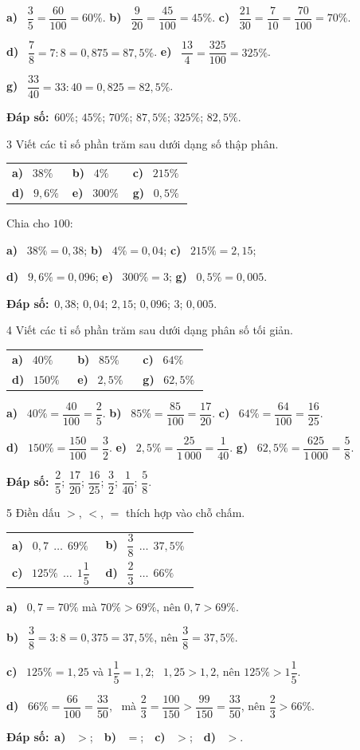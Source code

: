 \documentclass[11pt]{article}
\makeatletter
\newif\ifsol \solfalse
\renewcommand{\arraystretch}{1.35}
\providecommand{\AnsWord}{Đáp số}
\newcommand{\dapso}[1]{\par\textbf{\AnsWord:}\ #1}
\newcommand{\probsol}[1]{%
  \begin{lrbox}{\solmeasure}\begin{minipage}{\dimexpr\linewidth-24pt\relax}#1\end{minipage}\end{lrbox}%
  \ifsol
    \begin{solbox}#1\end{solbox}%
  \else
    \setlength{\solht}{\dimexpr\ht\solmeasure+\dp\solmeasure+0.85cm\relax}%
    \ifdim\solht<1.35cm\setlength{\solht}{1.35cm}\fi
    \begin{tcolorbox}[colback=white,colframe=Line,boxrule=0.8pt,arc=5pt,
      left=8pt,right=8pt,top=4pt,bottom=4pt,height=\solht]{\footnotesize\color{Slate}\itshape\WorkWord}\end{tcolorbox}%
  \fi}
\newcommand{\pa}[1]{\textbf{#1)}\ }
\newenvironment{cols2}{\par\vspace{3pt}\noindent\setlength{\tabcolsep}{0pt}\renewcommand{\arraystretch}{1.3}%
  \begin{tabular}{@{}>{\raggedright\arraybackslash\rule{0pt}{4.4ex}}p{0.48\linewidth}<{\rule[-2.3ex]{0pt}{0pt}}@{\hspace{0.03\linewidth}}>{\raggedright\arraybackslash\rule{0pt}{4.4ex}}p{0.48\linewidth}<{\rule[-2.3ex]{0pt}{0pt}}@{}}}%
  {\end{tabular}\par}
\newenvironment{cols3}{\par\vspace{3pt}\noindent\setlength{\tabcolsep}{0pt}\renewcommand{\arraystretch}{1.3}%
  \begin{tabular}{@{}>{\raggedright\arraybackslash\rule{0pt}{4.4ex}}p{0.32\linewidth}<{\rule[-2.3ex]{0pt}{0pt}}@{\hspace{0.015\linewidth}}>{\raggedright\arraybackslash\rule{0pt}{4.4ex}}p{0.32\linewidth}<{\rule[-2.3ex]{0pt}{0pt}}@{\hspace{0.015\linewidth}}>{\raggedright\arraybackslash\rule{0pt}{4.4ex}}p{0.32\linewidth}<{\rule[-2.3ex]{0pt}{0pt}}@{}}}%
  {\end{tabular}\par}
\newcommand{\gap}{\vspace{0.3cm}}
\def\WorkWord{Bài làm:}
\def\AnsWord{Đáp số}
\makeatother
\begin{document}
\probsol{
\pa{a} $\dfrac35=\dfrac{60}{100}=60\%$. \quad \pa{b} $\dfrac9{20}=\dfrac{45}{100}=45\%$. \quad \pa{c} $\dfrac{21}{30}=\dfrac7{10}=\dfrac{70}{100}=70\%$.\par
\pa{d} $\dfrac78=7:8=0{,}875=87{,}5\%$. \quad \pa{e} $\dfrac{13}4=\dfrac{325}{100}=325\%$.\par
\pa{g} $\dfrac{33}{40}=33:40=0{,}825=82{,}5\%$.
\dapso{$60\%$; $45\%$; $70\%$; $87{,}5\%$; $325\%$; $82{,}5\%$.}}
\gap
\begin{probbox}{3}{\relax}
Viết các tỉ số phần trăm sau dưới dạng số thập phân.
\begin{cols3}
\pa{a} $38\%$ & \pa{b} $4\%$ & \pa{c} $215\%$\\
\pa{d} $9{,}6\%$ & \pa{e} $300\%$ & \pa{g} $0{,}5\%$
\end{cols3}
\end{probbox}
\probsol{
Chia cho $100$:\par
\pa{a} $38\%=0{,}38$; \quad \pa{b} $4\%=0{,}04$; \quad \pa{c} $215\%=2{,}15$;\par
\pa{d} $9{,}6\%=0{,}096$; \quad \pa{e} $300\%=3$; \quad \pa{g} $0{,}5\%=0{,}005$.
\dapso{$0{,}38$; $0{,}04$; $2{,}15$; $0{,}096$; $3$; $0{,}005$.}}
\gap
\begin{probbox}{4}{\relax}
Viết các tỉ số phần trăm sau dưới dạng phân số tối giản.
\begin{cols3}
\pa{a} $40\%$ & \pa{b} $85\%$ & \pa{c} $64\%$\\
\pa{d} $150\%$ & \pa{e} $2{,}5\%$ & \pa{g} $62{,}5\%$
\end{cols3}
\end{probbox}
\probsol{
\pa{a} $40\%=\dfrac{40}{100}=\dfrac25$. \quad \pa{b} $85\%=\dfrac{85}{100}=\dfrac{17}{20}$. \quad \pa{c} $64\%=\dfrac{64}{100}=\dfrac{16}{25}$.\par
\pa{d} $150\%=\dfrac{150}{100}=\dfrac32$. \quad \pa{e} $2{,}5\%=\dfrac{25}{1\,000}=\dfrac1{40}$. \quad \pa{g} $62{,}5\%=\dfrac{625}{1\,000}=\dfrac58$.
\dapso{$\dfrac25$; $\dfrac{17}{20}$; $\dfrac{16}{25}$; $\dfrac32$; $\dfrac1{40}$; $\dfrac58$.}}
\gap
\begin{probbox}{5}{\relax}
Điền dấu $>$, $<$, $=$ thích hợp vào chỗ chấm.
\begin{cols2}
\pa{a} $0{,}7\ \ \dots\ \ 69\%$ & \pa{b} $\dfrac38\ \ \dots\ \ 37{,}5\%$\\
\pa{c} $125\%\ \ \dots\ \ 1\dfrac15$ & \pa{d} $\dfrac23\ \ \dots\ \ 66\%$
\end{cols2}
\end{probbox}
\probsol{
\pa{a} $0{,}7=70\%$ mà $70\%>69\%$, nên $0{,}7>69\%$.\par
\pa{b} $\dfrac38=3:8=0{,}375=37{,}5\%$, nên $\dfrac38=37{,}5\%$.\par
\pa{c} $125\%=1{,}25$ và $1\dfrac15=1{,}2$; \ $1{,}25>1{,}2$, nên $125\%>1\dfrac15$.\par
\pa{d} $66\%=\dfrac{66}{100}=\dfrac{33}{50}$, \ mà $\dfrac23=\dfrac{100}{150}>\dfrac{99}{150}=\dfrac{33}{50}$, nên $\dfrac23>66\%$.
\dapso{\pa{a} $>$;\ \ \pa{b} $=$;\ \ \pa{c} $>$;\ \ \pa{d} $>$.}}
\end{document}
